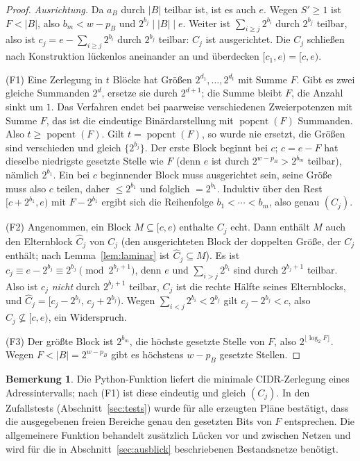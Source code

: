 \documentclass[a4paper,12pt, twoside]{report}
\theoremstyle{definition}
\newtheorem{bemerkung}{Bemerkung}
\DeclareMathOperator{\popcnt}{popcnt}
\newcommand{\code}[1]{\texttt{\detokenize{#1}}}
\begin{document}
\begin{proof}
	\emph{Ausrichtung.} Da $a_B$ durch $|B|$ teilbar ist, ist es auch $e$. Wegen $S' \ge 1$ ist $F < |B|$, also $b_m < w-p_B$ und $2^{b_j} \mid |B| \mid e$. Weiter ist $\sum_{i\ge j} 2^{b_i}$ durch $2^{b_j}$ teilbar, also ist $c_j = e - \sum_{i\ge j}2^{b_i}$ durch $2^{b_j}$ teilbar: $C_j$ ist ausgerichtet. Die $C_j$ schließen nach Konstruktion lückenlos aneinander an und überdecken $[c_1, e) = [c,e)$.

	(F1) Eine Zerlegung in $t$ Blöcke hat Größen $2^{d_1},\ldots,2^{d_t}$ mit Summe $F$. Gibt es zwei gleiche Summanden $2^d$, ersetze sie durch $2^{d+1}$; die Summe bleibt $F$, die Anzahl sinkt um $1$. Das Verfahren endet bei paarweise verschiedenen Zweierpotenzen mit Summe $F$, das ist die eindeutige Binärdarstellung mit $\popcnt(F)$ Summanden. Also $t \ge \popcnt(F)$. Gilt $t = \popcnt(F)$, so wurde nie ersetzt, die Größen sind verschieden und gleich $\{2^{b_j}\}$. Der erste Block beginnt bei $c$; $c = e - F$ hat dieselbe niedrigste gesetzte Stelle wie $F$ (denn $e$ ist durch $2^{w-p_B} > 2^{b_m}$ teilbar), nämlich $2^{b_1}$. Ein bei $c$ beginnender Block muss ausgerichtet sein, seine Größe muss also $c$ teilen, daher $\le 2^{b_1}$ und folglich $= 2^{b_1}$. Induktiv über den Rest $[c + 2^{b_1}, e)$ mit $F - 2^{b_1}$ ergibt sich die Reihenfolge $b_1<\cdots<b_m$, also genau $(C_j)$.

	(F2) Angenommen, ein Block $M \subseteq [c,e)$ enthalte $C_j$ echt. Dann enthält $M$ auch den Elternblock $\hat C_j$ von $C_j$ (den ausgerichteten Block der doppelten Größe, der $C_j$ enthält; nach Lemma~\ref{lem:laminar} ist $\hat C_j \subseteq M$). Es ist $c_j \equiv e - 2^{b_j} \equiv 2^{b_j} \pmod{2^{b_j+1}}$, denn $e$ und $\sum_{i>j}2^{b_i}$ sind durch $2^{b_j+1}$ teilbar. Also ist $c_j$ \emph{nicht} durch $2^{b_j+1}$ teilbar, $C_j$ ist die rechte Hälfte seines Elternblocks, und $\hat C_j = [c_j - 2^{b_j},\, c_j + 2^{b_j})$. Wegen $\sum_{i<j}2^{b_i} < 2^{b_j}$ gilt $c_j - 2^{b_j} < c$, also $\hat C_j \not\subseteq [c,e)$, ein Widerspruch.

	(F3) Der größte Block ist $2^{b_m}$, die höchste gesetzte Stelle von $F$, also $2^{\lfloor\log_2 F\rfloor}$. Wegen $F < |B| = 2^{w-p_B}$ gibt es höchstens $w - p_B$ gesetzte Stellen.
\end{proof}

\begin{bemerkung}
	Die Python-Funktion \code{ipaddress.summarize_address_range} liefert die minimale CIDR-Zerlegung eines Adressintervalls; nach (F1) ist diese eindeutig und gleich $(C_j)$. In den Zufallstests (Abschnitt~\ref{sec:tests}) wurde für alle erzeugten Pläne bestätigt, dass die ausgegebenen freien Bereiche genau den gesetzten Bits von $F$ entsprechen. Die allgemeinere Funktion \code{_free_ranges} behandelt zusätzlich Lücken vor und zwischen Netzen und wird für die in Abschnitt~\ref{sec:ausblick} beschriebenen Bestandsnetze benötigt.
\end{bemerkung}
\end{document}

